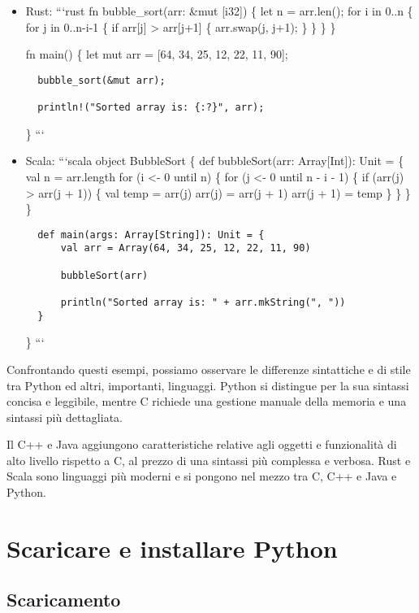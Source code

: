 \documentclass[
  letterpaper,
]{scrbook}
\begin{document}
\begin{itemize}
  \} ```
\item
  Rust: ```rust fn bubble\_sort(arr: \&mut {[}i32{]}) \{ let n =
  arr.len(); for i in 0..n \{ for j in 0..n-i-1 \{ if arr{[}j{]}
  \textgreater{} arr{[}j+1{]} \{ arr.swap(j, j+1); \} \} \} \}

  fn main() \{ let mut arr = {[}64, 34, 25, 12, 22, 11, 90{]};

\begin{verbatim}
  bubble_sort(&mut arr);

  println!("Sorted array is: {:?}", arr);
\end{verbatim}

  \} ```
\item
  Scala: ```scala object BubbleSort \{ def bubbleSort(arr:
  Array{[}Int{]}): Unit = \{ val n = arr.length for (i \textless- 0
  until n) \{ for (j \textless- 0 until n - i - 1) \{ if (arr(j)
  \textgreater{} arr(j + 1)) \{ val temp = arr(j) arr(j) = arr(j + 1)
  arr(j + 1) = temp \} \} \} \}

\begin{verbatim}
  def main(args: Array[String]): Unit = {
      val arr = Array(64, 34, 25, 12, 22, 11, 90)

      bubbleSort(arr)

      println("Sorted array is: " + arr.mkString(", "))
  }
\end{verbatim}

  \} ```
\end{itemize}

Confrontando questi esempi, possiamo osservare le differenze sintattiche
e di stile tra Python ed altri, importanti, linguaggi. Python si
distingue per la sua sintassi concisa e leggibile, mentre C richiede una
gestione manuale della memoria e una sintassi più dettagliata.

Il C++ e Java aggiungono caratteristiche relative agli oggetti e
funzionalità di alto livello rispetto a C, al prezzo di una sintassi più
complessa e verbosa. Rust e Scala sono linguaggi più moderni e si
pongono nel mezzo tra C, C++ e Java e Python.

\chapter{Scaricare e installare
Python}\label{scaricare-e-installare-python}

\section{Scaricamento}\label{scaricamento}
\end{document}
